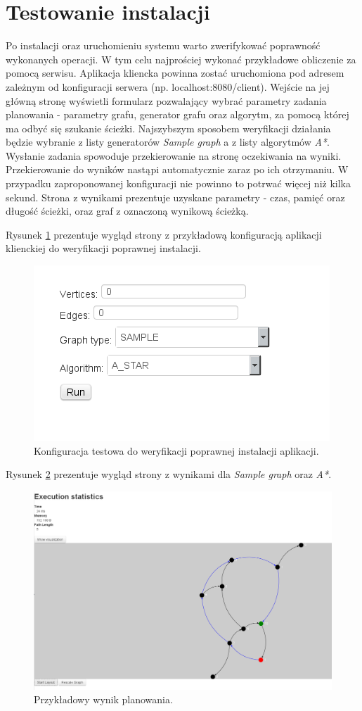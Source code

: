 \section{Testowanie instalacji}

Po instalacji oraz uruchomieniu systemu warto zwerifykować poprawność wykonanych operacji.
W tym celu najprościej wykonać przykładowe obliczenie za pomocą serwisu.
Aplikacja kliencka powinna zostać uruchomiona pod adresem zależnym od konfiguracji serwera (np. localhost:8080/client).
Wejście na jej główną stronę wyświetli formularz pozwalający wybrać parametry zadania planowania - parametry grafu, generator grafu oraz algorytm, za pomocą której ma odbyć się szukanie ścieżki.
Najszybszym sposobem weryfikacji działania będzie wybranie z listy generatorów {\it Sample graph} a z listy algorytmów {\it A*}.
Wysłanie zadania spowoduje przekierowanie na stronę oczekiwania na wyniki.
Przekierowanie do wyników nastąpi automatycznie zaraz po ich otrzymaniu.
W przypadku zaproponowanej konfiguracji nie powinno to potrwać więcej niż kilka sekund.
Strona z wynikami prezentuje uzyskane parametry - czas, pamięć oraz długość ścieżki, oraz graf z oznaczoną wynikową ścieżką.

Rysunek \ref{fig:konfiguracja} prezentuje wygląd strony z przykładową konfiguracją aplikacji klienckiej do weryfikacji poprawnej instalacji.

\begin{figure}[!h]
	\centering
	\includegraphics{img/input}
	\caption{Konfiguracja testowa do weryfikacji poprawnej instalacji aplikacji.}
	\label{fig:konfiguracja}
\end{figure}

Rysunek \ref{fig:wyniki} prezentuje wygląd strony z wynikami dla {\it Sample graph} oraz {\it A*}.

\begin{figure}[!h]
	\centering
	\includegraphics[width=\linewidth]{img/results}
	\caption{Przykładowy wynik planowania.}
	\label{fig:wyniki}
\end{figure}